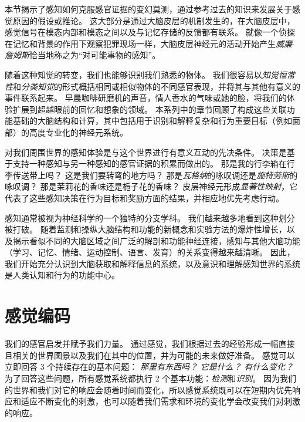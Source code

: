 本节揭示了感知如何克服感官证据的变幻莫测，通过参考过去的知识来发展关于感觉原因的假设或推论。
这大部分是通过大脑皮层的机制发生的，在大脑皮层中，感觉信号在模态内部和模态之间以及与记忆存储的反馈都有联系。
就像一个侦探在记忆和背景的作用下观察犯罪现场一样，大脑皮层神经元的活动开始产生\textit{威廉$\cdot$詹姆斯}恰当地称之为“对可能事物的感知”。


随着这种知觉的转变，我们也能够识别我们熟悉的物体。
我们很容易以\textit{知觉恒常性}和\textit{分类知觉}的形式概括相同或相似物体的不同感官表现，并将其与其他有意义的事件联系起来。
早晨咖啡研磨机的声音，情人香水的气味或她的脸，将我们的体验扩展到超越眼前的回忆和想象的领域。
本系列中的章节回顾了构成这些关联功能基础的大脑结构和计算，其中包括用于识别和解释复杂和行为重要目标（例如面部）的高度专业化的神经元系统。


对我们周围世界的感知体验是与这个世界进行有意义互动的先决条件。
决策是基于支持一种感知与另一种感知的感官证据的积累而做出的。
那是我的行李箱在行李传送带上吗？
这是我们要转弯的地方吗？
那是\textit{瓦格纳}的咏叹调还是\textit{施特劳斯}的咏叹调？
那是茉莉花的香味还是栀子花的香味？
皮层神经元形成\textit{显著性映射}，它代表了这些感知决策在行为目标和奖励方面的结果，并相应地优先考虑行动。


感知通常被视为神经科学的一个独特的分支学科。
我们越来越多地看到这种划分被打破。
随着监测和操纵大脑结构和功能的新概念和实验方法的爆炸性增长，以及揭示看似不同的大脑区域之间广泛的解剖和功能神经连接，感知与其他大脑功能（学习、记忆、情绪、运动控制、语言、发育）的关系变得越来越清晰。
因此，我们开始充分认识到大脑获取和解释信息的系统，以及意识和理解感知世界的系统是人类认知和行为的功能中心。



\chapter{感觉编码} \label{chap:chap17}


我们的感官启发并赋予我们力量。
通过感觉，我们根据过去的经验形成一幅直接且相关的世界图景以及我们在其中的位置，并为可能的未来做好准备。 
感觉可以立即回答 3 个持续存在的基本问题：
\textit{那里有东西吗？}
\textit{它是什么？}
\textit{有什么变化？}
为了回答这些问题，所有感觉系统都执行 2 个基本功能：\textit{检测}和\textit{识别}。
因为我们的世界和我们对它的响应会随着时间而变化，所以感觉系统既可以在短期内优先响应和适应不断变化的刺激，也可以随着我们需求和环境的变化学会改变我们对刺激的响应。


